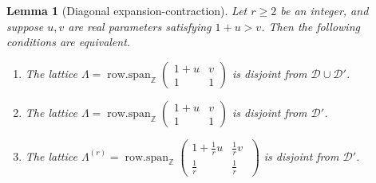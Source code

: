 \documentclass[11pt, letterpaper, reqno]{amsart}
\newtheorem{lem}[thm]{Lemma}
\theoremstyle{definition}
\theoremstyle{remark}
\numberwithin{equation}{section}
\newcommand{\ZZ}{\ensuremath{\mathbb{Z}}}
\newcommand{\cD}{\mathcal{D}}
\newcommand{\cDprime}{{\mathcal{D}'}}
\newcommand{\muu}{u}
\newcommand{\nuu}{v}
\DeclareMathOperator{\rowspan}{row.span}
\begin{document}
\begin{lem}[Diagonal expansion-contraction]
\label{lem:diag-expansion} Let $r \ge 2$ be an integer, and
suppose $\muu , \nuu $ are  real parameters satisfying $1+\muu > \nuu$.
Then the following conditions are equivalent.
\begin{enumerate}
\item[\textnormal{(S1')}] 
The lattice 
$\Lambda = \rowspan_\ZZ\begin{pmatrix}
1+\muu & \nuu \\
1 & 1 \end{pmatrix}$
is disjoint from $\cD\cup \cDprime$.

\item[\textnormal{(S2')}] 
The lattice 
$\Lambda = \rowspan_\ZZ\begin{pmatrix}
1+\muu & \nuu \\
1 & 1 \end{pmatrix}$
is disjoint from $ \cDprime$.

\item[\textnormal{(S3')}] 
 The lattice
$\Lambda^{(r)} = \rowspan_\ZZ\begin{pmatrix}
1+\frac{1}{r}\muu & \frac1{r}\nuu \phantom{\Big|}\\
\frac1{r} & \frac1{r} \phantom{\Big|} \end{pmatrix} $
is disjoint from $\cDprime$.

\end{enumerate}
\end{lem}
\end{document}
